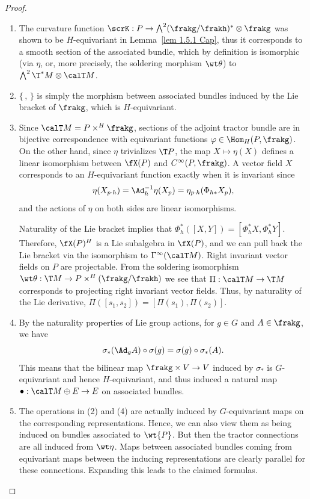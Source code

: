 \begin{proof}
    \begin{enumerate}[label=(\arabic*)]
        \item The curvature function $\scrK:P\to \bigwedge^2(\frakg\slash\frakh)^\ast\otimes\frakg$ was shown to be $H$-equivariant in Lemma~\ref{lem 1.5.1 Cap}, thus it corresponds to a smooth section of the associated bundle, which by definition is isomorphic (via $\eta$, or, more precisely, the soldering morphism $\wt\theta$) to $\bigwedge^2\T^\ast M\otimes\calT M$.
        \item $\{\,,\,\}$ is simply the morphism between associated bundles induced by the Lie bracket of $\frakg$, which is $H$-equivariant.
        \item Since $\calT M=P\times^H\frakg$, sections of the adjoint tractor bundle are in bijective correspondence with equivariant functions $\varphi\in\Hom_H(P,\frakg)$. On the other hand, since $\eta$ trivializes $\T P$, the map $X\mapsto \eta(X)$ defines a linear isomorphism between $\fX(P)$ and $C^\infty(P,\frakg)$. A vector field $X$ corresponds to an $H$-equivariant function exactly when it is invariant since
        \[\eta(X_{p\cdot h})=\Ad_h^{-1}\eta(X_p)=\eta_{p\cdot h}(\Phi_{h\ast}X_p),\]
        and the actions of $\eta$ on both sides are linear isomorphisms.

        Naturality of the Lie bracket implies that $\Phi_h^\ast([X,Y])=[\Phi_h^\ast X,\Phi_h^\ast Y]$. Therefore, $\fX(P)^H$ is a Lie subalgebra in $\fX(P)$, and we can pull back the Lie bracket via the isomorphism to $\Gamma^\infty(\calT M)$. Right invariant vector fields on $P$ are projectable. From the soldering isomorphism $\wt\theta:\T M\to P\times^H (\frakg\slash\frakh)$ we see that $\Pi:\calT M\to \T M$ corresponds to projecting right invariant vector fields. Thus, by naturality of the Lie derivative, $\Pi([s_1,s_2])=[\Pi(s_1),\Pi(s_2)]$.
        \item By the naturality properties of Lie group actions, for $g\in G$ and $A\in\frakg$, we have
        \[\sigma_\ast(\Ad_g A)\circ \sigma(g)=\sigma(g)\circ \sigma_\ast(A).\]
        This means that the bilinear map $\frakg\times V\to V$ induced by $\sigma_\ast$ is $G$-equivariant and hence $H$-equivariant, and thus induced a natural map $\bullet:\calT M\oplus E\to E$ on associated bundles.
        \item The operations in (2) and (4) are actually induced by $G$-equivariant maps on the corresponding representations. Hence, we can also view them as being induced on bundles associated to $\wt{P}$. But then the tractor connections are all induced from $\wt\eta$. Maps between associated bundles coming from equivariant maps between the inducing representations are clearly parallel for these connections. Expanding this leads to the claimed formulas.
    \end{enumerate}
\end{proof}



